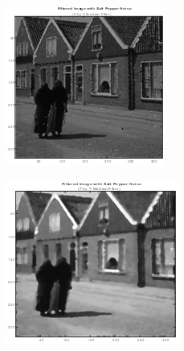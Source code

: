 \begin{figure}
    \centering
    \begin{subfigure}{0.4\textwidth}
        \includegraphics[width=\textwidth]{Resources/F9-a.png}
        \caption{}
        \label{fig:first}
    \end{subfigure}
    \hfill
    \begin{subfigure}{0.4\textwidth}
        \includegraphics[width=\textwidth]{Resources/F9-b.png}

\end{subfigure}
\end{figure}
